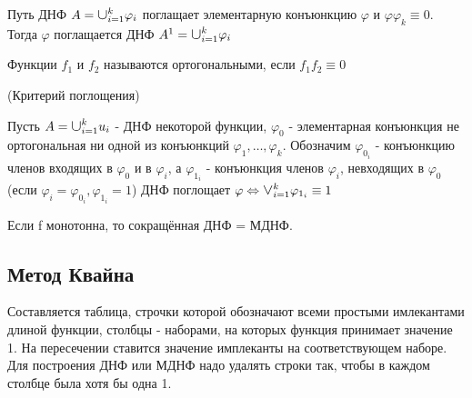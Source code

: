 \lem Путь ДНФ $A = \mathlarger{\mathlarger{\cup}} _{i=1}^k\varphi_i$ поглащает элементарную конъюнкцию $\varphi$ и $\varphi \varphi_k \equiv 0$. Тогда $\varphi$ поглащается ДНФ $A^1=\mathlarger{\mathlarger{\cup}} _{i=1}^k\varphi_i$

\opr Функции $f_1$ и $f_2$ называются ортогональными, если $f_1f_2 \equiv 0$

\thr(Критерий поглощения)\par
Пусть  $A=\mathlarger{\mathlarger{\cup}} _{i=1}^k u_i$ - ДНФ некоторой функции, $\varphi_0$ - элементарная конъюнкция не ортогональная ни одной из конъюнкций $\varphi_1, \dotsc,\varphi_k$. Обозначим $\varphi_{0_i}$ - конъюнкцию членов входящих в $\varphi_0$  и в $\varphi_i$, а $\varphi_{1_i}$ - конъюнкция членов $\varphi_i$, невходящих в $\varphi_0$ (если $\varphi_i = \varphi_{0_i}, \varphi_{1_i} = 1$) ДНФ поглощает $\varphi \Leftrightarrow \mathlarger{\mathlarger{\vee}} _{i=1}^k\varphi_{1_i} \equiv 1$

\utv Если f монотонна, то сокращённая ДНФ = МДНФ.

\subsection {Метод Квайна}
Составляется таблица, строчки которой обозначают всеми простыми имлекантами длиной функции, столбцы - наборами, на которых функция принимает значение 1. На пересечении ставится значение имплеканты на соответствующем наборе. Для построения ДНФ или МДНФ надо удалять строки так, чтобы в каждом столбце была хотя бы одна 1.